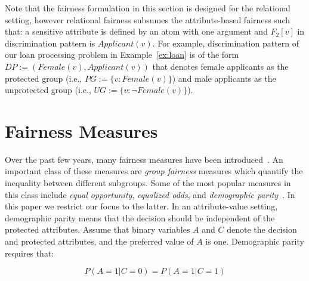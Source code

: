 \documentclass[11pt]{article}
\begin{document}
Note that the fairness formulation in this section is designed for the relational setting, however relational fairness subsumes the attribute-based fairness such that: a sensitive attribute is defined by an atom with one argument and $F_2[v]$ in discrimination pattern is $\textit{Applicant}(v)$. For example, discrimination pattern of our loan processing problem in Example~\ref{ex:loan} is of the form $\textit{DP} := ( \textit{Female}(v), \textit{Applicant}(v))$ that denotes female applicants as the protected group (i.e., $PG :=  \{ v: \textit{Female}(v) \}$) and male applicants as the unprotected group (i.e., $UG := \{ v: \neg \textit{Female}(v)\}$).


\section{Fairness Measures}
\label{sec:fairnessmeasure}

Over the past few years, many fairness measures have been introduced~\cite{verma2018fairness2}. An important class of these measures are \emph{group fairness} measures which quantify the inequality between different subgroups. Some of the most popular measures in this class include \emph{equal opportunity}, \emph{equalized odds}, and \emph{demographic parity}~\cite{hardt2016equality3}. In this paper we restrict our focus to the latter. In an attribute-value setting, demographic parity means that the decision should be independent of the protected attributes. Assume that binary variables $A$ and $C$ denote the decision and protected attributes, and the preferred value of $A$ is one. Demographic parity requires that:

\begin{equation*}
    P(A=1 | C=0) = P(A=1 | C=1)
\end{equation*}
\end{document}
